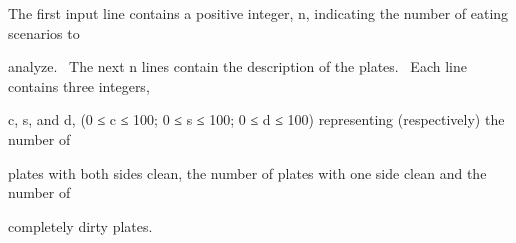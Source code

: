 The first input line contains a positive integer, n, indicating the number of eating scenarios to 

analyze.  The next n lines contain the description of the plates.  Each line contains three integers, 

c, s, and d, (0 ≤ c ≤ 100; 0 ≤ s ≤ 100; 0 ≤ d ≤ 100) representing (respectively) the number of 

plates with both sides clean, the number of plates with one side clean and the number of 

completely dirty plates.